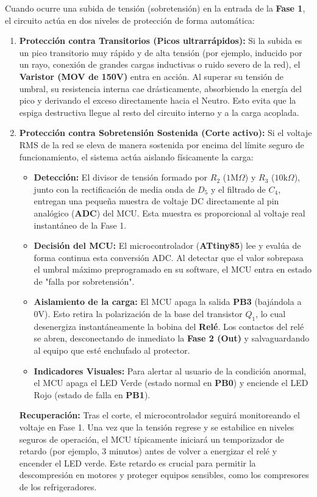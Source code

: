 \documentclass[12pt, a4paper]{article}
\begin{document}
Cuando ocurre una subida de tensión (sobretensión) en la entrada de la \textbf{Fase 1}, el circuito actúa en dos niveles de protección de forma automática:

\begin{enumerate}
    \item \textbf{Protección contra Transitorios (Picos ultrarrápidos):} 
    Si la subida es un pico transitorio muy rápido y de alta tensión (por ejemplo, inducido por un rayo, conexión de grandes cargas inductivas o ruido severo de la red), el \textbf{Varistor (MOV de 150V)} entra en acción. Al superar su tensión de umbral, su resistencia interna cae drásticamente, absorbiendo la energía del pico y derivando el exceso directamente hacia el Neutro. Esto evita que la espiga destructiva llegue al resto del circuito interno y a la carga acoplada.

    \item \textbf{Protección contra Sobretensión Sostenida (Corte activo):}
    Si el voltaje RMS de la red se eleva de manera sostenida por encima del límite seguro de funcionamiento, el sistema actúa aislando físicamente la carga:
    \begin{itemize}
        \item \textbf{Detección:} El divisor de tensión formado por $R_2$ ($1\text{M}\Omega$) y $R_3$ ($10\text{k}\Omega$), junto con la rectificación de media onda de $D_5$ y el filtrado de $C_4$, entregan una pequeña muestra de voltaje DC directamente al pin analógico (\textbf{ADC}) del MCU. Esta muestra es proporcional al voltaje real instantáneo de la Fase 1.
        \item \textbf{Decisión del MCU:} El microcontrolador (\textbf{ATtiny85}) lee y evalúa de forma continua esta conversión ADC. Al detectar que el valor sobrepasa el umbral máximo preprogramado en su software, el MCU entra en estado de "falla por sobretensión".
        \item \textbf{Aislamiento de la carga:} El MCU apaga la salida \textbf{PB3} (bajándola a $0\text{V}$). Esto retira la polarización de la base del transistor $Q_1$, lo cual desenergiza instantáneamente la bobina del \textbf{Relé}. Los contactos del relé se abren, desconectando de inmediato la \textbf{Fase 2 (Out)} y salvaguardando al equipo que esté enchufado al protector.
        \item \textbf{Indicadores Visuales:} Para alertar al usuario de la condición anormal, el MCU apaga el LED Verde (estado normal en \textbf{PB0}) y enciende el LED Rojo (estado de falla en \textbf{PB1}).
    \end{itemize}
    
    \textbf{Recuperación:} Tras el corte, el microcontrolador seguirá monitoreando el voltaje en Fase 1. Una vez que la tensión regrese y se estabilice en niveles seguros de operación, el MCU típicamente iniciará un temporizador de retardo (por ejemplo, 3 minutos) antes de volver a energizar el relé y encender el LED verde. Este retardo es crucial para permitir la descompresión en motores y proteger equipos sensibles, como los compresores de los refrigeradores.
\end{enumerate}
\end{document}
